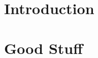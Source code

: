 \documentclass[10pt]{report}
\newcommand{\newchapter}[2] { \newpage \chapter{#1} \label{chap:#2}  }
\begin{document}
\singlespacing





\tableofcontents
\listoffigures
\listoftables
\newpage



\newchapter{Introduction}{introduction}
\newchapter{Good Stuff}{chapter1}

\singlespacing
\appendix
\newpage



\end{document}
